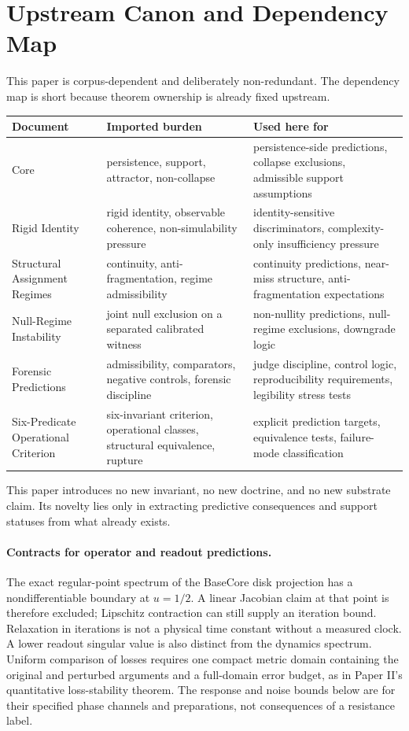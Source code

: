 \documentclass[11pt,a4paper]{article}
\begin{document}
\section{Upstream Canon and Dependency Map}
This paper is corpus-dependent and deliberately non-redundant. The dependency map is short because theorem ownership is already fixed upstream.

\begin{center}
\renewcommand{\arraystretch}{1.18}
\setlength{\tabcolsep}{5pt}
\begin{tabularx}{\linewidth}{@{}lY Y@{}}
\toprule
Document & Imported burden & Used here for \\
\midrule
Core \cite{core} & persistence, support, attractor, non-collapse & persistence-side predictions, collapse exclusions, admissible support assumptions \\
Rigid Identity \cite{paper1} & rigid identity, observable coherence, non-simulability pressure & identity-sensitive discriminators, complexity-only insufficiency pressure \\
Structural Assignment Regimes \cite{paper2} & continuity, anti-fragmentation, regime admissibility & continuity predictions, near-miss structure, anti-fragmentation expectations \\
Null-Regime Instability \cite{paper3} & joint null exclusion on a separated calibrated witness & non-nullity predictions, null-regime exclusions, downgrade logic \\
Forensic Predictions \cite{paper4} & admissibility, comparators, negative controls, forensic discipline & judge discipline, control logic, reproducibility requirements, legibility stress tests \\
Six-Predicate Operational Criterion \cite{paper5} & six-invariant criterion, operational classes, structural equivalence, rupture & explicit prediction targets, equivalence tests, failure-mode classification \\
\bottomrule
\end{tabularx}
\end{center}

This paper introduces no new invariant, no new doctrine, and no new substrate claim. Its novelty lies only in extracting predictive consequences and support statuses from what already exists.

\paragraph{Contracts for operator and readout predictions.}
The exact regular-point spectrum of the BaseCore disk projection has a
nondifferentiable boundary at $u=1/2$. A linear Jacobian claim at that point
is therefore excluded; Lipschitz contraction can still supply an iteration
bound. Relaxation in iterations is not a physical time constant without a
measured clock. A lower readout singular value is also distinct from the
dynamics spectrum. Uniform comparison of losses requires one compact metric
domain containing the original and perturbed arguments and a full-domain
error budget, as in Paper II's quantitative loss-stability theorem. The
response and noise bounds below are for their specified phase channels and
preparations, not consequences of a resistance label.
\end{document}
